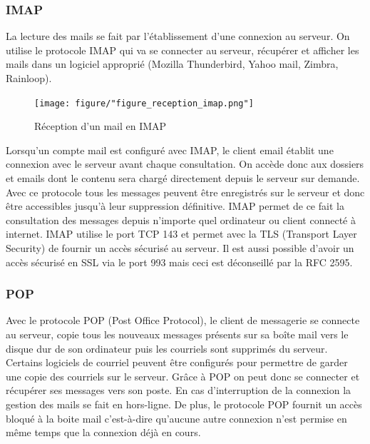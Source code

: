 \documentclass[a4paper,12pt,french]{report} %
\begin{document}
\subsubsection{IMAP}
La lecture des mails se fait par l'établissement d'une connexion au serveur. On utilise le protocole IMAP qui va se connecter au serveur, récupérer et afficher les mails dans un logiciel approprié (Mozilla Thunderbird, Yahoo mail, Zimbra, Rainloop).
\begin{figure}[H]
\centering
\texttt{[image: figure/"figure\_reception\_imap.png"]} 
\caption{Réception d'un mail en IMAP}
\label{Reception d'un mail en IMAP}
\end{figure}
Lorsqu’un compte mail est configuré avec IMAP, le client email établit une connexion avec le serveur avant chaque consultation. On accède donc aux dossiers et emails dont le contenu sera chargé directement depuis le serveur sur demande. Avec ce protocole tous les messages peuvent être enregistrés sur le serveur et donc être accessibles jusqu’à leur suppression définitive. IMAP permet de ce fait la consultation des messages depuis n’importe quel ordinateur ou client connecté à internet. IMAP utilise le port TCP 143 et permet avec la TLS (Transport Layer Security) de fournir un accès sécurisé au serveur. Il est aussi possible d’avoir un accès sécurisé en SSL via le port 993 mais ceci est déconseillé par la RFC 2595.
\subsubsection{POP}
Avec le protocole POP (Post Office Protocol), le client de messagerie se connecte au serveur, copie tous les nouveaux messages présents sur sa boîte mail vers le disque dur de son ordinateur puis les courriels sont supprimés du serveur. Certains logiciels de courriel peuvent être configurés pour permettre de garder une copie des courriels sur le serveur. Grâce à POP on peut donc se connecter et récupérer ses messages vers son poste. En cas d’interruption de la connexion la gestion des mails se fait en hors-ligne. De plus, le protocole POP fournit un accès bloqué à la boite mail c’est-à-dire qu’aucune autre connexion n’est permise en même temps que la connexion déjà en cours.%
\end{document}
